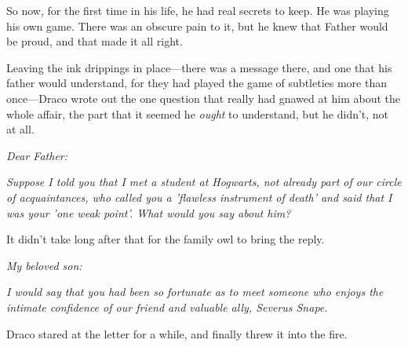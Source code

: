 So now, for the first time in his life, he had real secrets to keep. He was 
playing his own game. There was an obscure pain to it, but he knew that Father 
would be proud, and that made it all right.

Leaving the ink drippings in place---there was a message there, and one that 
his father would understand, for they had played the game of subtleties more 
than once---Draco wrote out the one question that really had gnawed at him 
about the whole affair, the part that it seemed he \emph{ought} to understand, 
but he didn't, not at all.

\emph{Dear Father:}

\emph{Suppose I told you that I met a student at Hogwarts, not already part of 
our circle of acquaintances, who called you a 'flawless instrument of death' 
and said that I was your 'one weak point'. What would you say about him?}

It didn't take long after that for the family owl to bring the reply.

\emph{My beloved son:}

\emph{I would say that you had been so fortunate as to meet someone who enjoys 
the intimate confidence of our friend and valuable ally, Severus Snape.}

Draco stared at the letter for a while, and finally threw it into the fire.